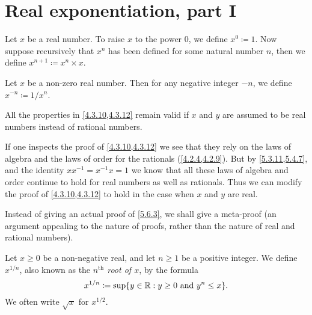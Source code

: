 \section{Real exponentiation, part I}\label{sec:5.6}

\begin{defn}\label{5.6.1}
  Let \(x\) be a real number.
  To raise \(x\) to the power \(0\), we define \(x^0 \coloneqq 1\).
  Now suppose recursively that \(x^n\) has been defined for some natural number \(n\), then we define \(x^{n + 1} \coloneqq x^n \times x\).
\end{defn}

\begin{defn}\label{5.6.2}
  Let \(x\) be a non-zero real number.
  Then for any negative integer \(-n\), we define \(x^{-n} \coloneqq 1 / x^n\).
\end{defn}

\begin{prop}\label{5.6.3}
  All the properties in \cref{4.3.10,4.3.12} remain valid if \(x\) and \(y\) are assumed to be real numbers instead of rational numbers.
\end{prop}

\begin{meta-proof}
If one inspects the proof of \cref{4.3.10,4.3.12} we see that they rely on the laws of algebra and the laws of order for the rationals (\cref{4.2.4,4.2.9}).
But by \cref{5.3.11,5.4.7}, and the identity \(xx^{-1} = x^{-1} x = 1\) we know that all these laws of algebra and order continue to hold for real numbers as well as rationals.
Thus we can modify the proof of \cref{4.3.10,4.3.12} to hold in the case when \(x\) and \(y\) are real.
\end{meta-proof}

\begin{note}
  Instead of giving an actual proof of \cref{5.6.3}, we shall give a meta-proof
  (an argument appealing to the nature of proofs, rather than the nature of real and rational numbers).
\end{note}

\begin{defn}\label{5.6.4}
  Let \(x \geq 0\) be a non-negative real, and let \(n \geq 1\) be a positive integer.
  We define \(x^{1 / n}\), also known as the \emph{\(n^{\text{th}}\) root of \(x\)}, by the formula
  \[
    x^{1 / n} \coloneqq \sup\{y \in \mathbb{R} : y \geq 0 \text{ and } y^n \leq x\}.
  \]
  We often write \(\sqrt{x}\) for \(x^{1 / 2}\).
\end{defn}

